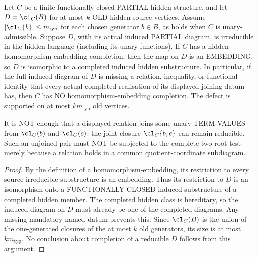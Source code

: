 \begin{lemma}
\label{lem:typed-joined-source-support}
Let \(C\) be a finite functionally closed PARTIAL
hidden structure, and let \(D=\cl_C(B)\)
for at most \(k\) OLD hidden source vertices.
Assume \( |\cl_C\{b\}|\le m_{\mathrm{typ}}\) for each chosen generator
\(b\in B\), as holds when \(C\) is unary-admissible.
Suppose \(D\), with its actual induced
PARTIAL diagram, is irreducible in the
hidden language (including its unary functions).
If \(C\) has a hidden
homomorphism-embedding completion,
then the map on \(D\) is an EMBEDDING,
so \(D\) is isomorphic to a completed
induced hidden substructure. In particular,
if the full induced diagram of \(D\) is
missing a relation, inequality, or
functional identity that every actual
completed realisation of its displayed
joining datum has, then \(C\) has NO
homomorphism-embedding completion.
The defect is supported on at most
\(k m_{\mathrm{typ}}\) old vertices.

It is NOT enough that a displayed relation
joins some unary TERM VALUES from
\(\cl_C(b)\) and \(\cl_C(c)\):
the joint closure \(\cl_C\{b,c\}\)
can remain reducible. Such an
unjoined pair must NOT be subjected
to the complete two-root test merely
because a relation holds in a common
quotient-coordinate subdiagram.
\end{lemma}
\begin{proof}
By the definition of a homomorphism-embedding,
its restriction to every source irreducible
substructure is an embedding.
Thus its restriction to \(D\) is an
isomorphism onto a FUNCTIONALLY CLOSED
induced substructure of a completed
hidden member. The completed hidden class
is hereditary, so the induced diagram
on \(D\) must already be one of the
completed diagrams. Any missing mandatory
named datum prevents this. Since
\(\cl_C(B)\) is the union of the
one-generated closures of the at
most \(k\) old generators, its size
is at most \(k m_{\mathrm{typ}}\).
No conclusion about completion of
a reducible \(D\) follows from this
argument.
\end{proof}

